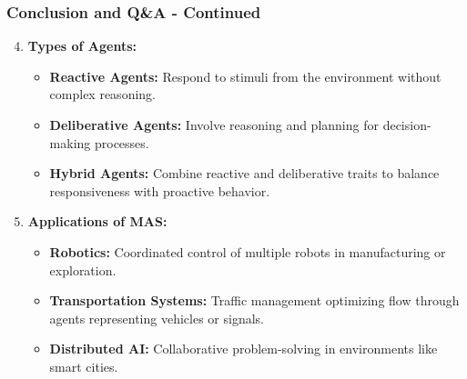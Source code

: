 \documentclass[aspectratio=169]{beamer}
\begin{document}
\begin{frame}[fragile]
    \frametitle{Conclusion and Q\&A - Continued}
    
    \begin{enumerate}
        \setcounter{enumi}{3} %
        \item \textbf{Types of Agents:}
        \begin{itemize}
            \item \textbf{Reactive Agents:} Respond to stimuli from the environment without complex reasoning.
            \item \textbf{Deliberative Agents:} Involve reasoning and planning for decision-making processes.
            \item \textbf{Hybrid Agents:} Combine reactive and deliberative traits to balance responsiveness with proactive behavior.
        \end{itemize}

        \item \textbf{Applications of MAS:}
        \begin{itemize}
            \item \textbf{Robotics:} Coordinated control of multiple robots in manufacturing or exploration.
            \item \textbf{Transportation Systems:} Traffic management optimizing flow through agents representing vehicles or signals.
            \item \textbf{Distributed AI:} Collaborative problem-solving in environments like smart cities.
        \end{itemize}
    \end{enumerate}
\end{frame}
\end{document}
